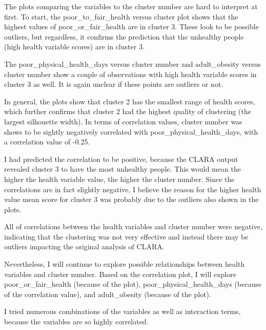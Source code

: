 \documentclass[12pt,twoside]{amherstthesis}
\begin{document}
  The plots comparing the variables to the cluster number are hard to
  interpret at first. To start, the poor\_to\_fair\_health versus cluster
  plot shows that the highest values of poor\_or\_fair\_health are in
  cluster 3. These look to be possible outliers, but regardless, it
  confirms the prediction that the unhealthy people (high health variable
  scores) are in cluster 3.
  
  The poor\_physical\_health\_days versus cluster number and
  adult\_obesity versus cluster number show a couple of observations with
  high health variable scores in cluster 3 as well. It is again unclear if
  these points are outliers or not.
  
  In general, the plots show that cluster 2 has the smallest range of
  health scores, which further confirms that cluster 2 had the highest
  quality of clustering (the largest silhouette width). In terms of
  correlation values, cluster number was shows to be sightly negatively
  correlated with poor\_physical\_health\_days, with a correlation value
  of -0.25.
  
  I had predicted the correlation to be positive, because the CLARA output
  revealed cluster 3 to have the most unhealthy people. This would mean
  the higher the health variable value, the higher the cluster number.
  Since the correlations are in fact slightly negative, I believe the
  reason for the higher health value mean score for cluster 3 was probably
  due to the outliers also shown in the plots.
  
  All of correlations between the health variables and cluster number were
  negative, indicating that the clustering was not very effective and
  instead there may be outliers impacting the original analysis of CLARA.
  
  Nevertheless, I will continue to explore possible relationships between
  health variables and cluster number. Based on the correlation plot, I
  will explore poor\_or\_fair\_health (because of the plot),
  poor\_physical\_health\_days (because of the correlation value), and
  adult\_obesity (because of the plot).
  
  I tried numerous combinations of the variables as well as interaction
  terms, because the variables are so highly correlated.
  
\end{document}
